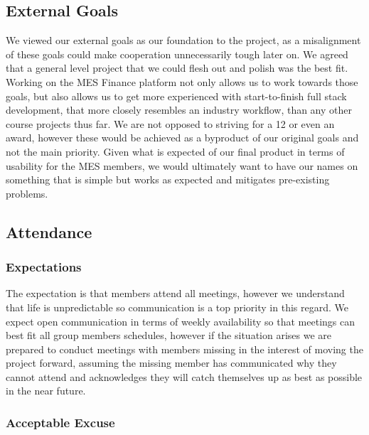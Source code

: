 \documentclass{article}
\begin{document}

\subsection*{External Goals}

We viewed our external goals as our foundation to the project, as a misalignment of these goals could make cooperation unnecessarily tough later on. We agreed that a general level project that we could flesh out and polish was the best fit. Working on the MES Finance platform not only allows us to work towards those goals, but also allows us to get more experienced with start-to-finish full stack development, 
that more closely resembles an industry workflow, than any other course projects thus far. We are not opposed to striving for a 12 or even an award, however these would be achieved as a byproduct of our original goals and not the main priority. Given what is expected of our final product in terms of usability for the MES members, we would ultimately want to have our names on something that is simple but works as expected and mitigates pre-existing problems. 

\subsection*{Attendance}

\subsubsection*{Expectations}

The expectation is that members attend all meetings, however we understand that life is unpredictable so communication is a top priority in this regard. We expect open communication in terms of weekly availability so that meetings can best fit all group members schedules, however if the situation arises we are prepared to conduct meetings with members missing in the interest of moving the project forward, assuming the missing member has communicated why they cannot attend and acknowledges they will catch themselves up as best as possible in the near future.

\subsubsection*{Acceptable Excuse}
\end{document}
